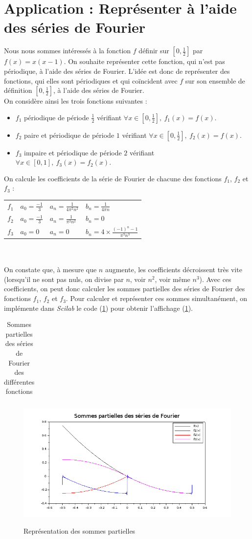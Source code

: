 \documentclass[a4paper,10pt]{report}
\begin{document}
\section{Application : Représenter à l'aide des séries de Fourier}
Nous nous sommes intéressés à la fonction $f$ définir sur $[0,\frac{1}{2}]$ par $f(x)=x(x-1)$. On souhaite représenter cette fonction, qui n'est pas périodique, à l'aide des séries de Fourier. L'idée est donc de représenter des fonctions, qui elles sont périodiques et qui coïncident avec $f$ sur son ensemble de définition $[0,\frac{1}{2}]$, à l'aide des séries de Fourier.\\
On considère ainsi les trois fonctions suivantes :
\begin{itemize}
\item $f_1$ périodique de période $\frac{1}{2}$ vérifiant $\forall x \in [0,\frac{1}{2}], \ f_1(x)=f(x).$
\item $f_2$ paire et périodique de période $1$ vérifiant $\forall x \in [0,\frac{1}{2}], \ f_2(x)=f(x).$
\item $f_3$ impaire et périodique de période $2$ vérifiant $\forall x \in [0,1], \ f_3(x)=f_2(x).$
\end{itemize}
On calcule les coefficients de la série de Fourier de chacune des fonctions $f_1$, $f_2$ et $f_3$ : \\
\begin{tabular}{llll}
$f_1$ & $a_0=\frac{-1}{3}$ & $a_n=\frac{1}{4\pi^2n^2}$ & $b_n=\frac{1}{4\pi n}$ \\
$f_2$ & $a_0=\frac{-1}{3}$ & $a_n=\frac{1}{\pi^2n^2}$ & $b_n=0$ \\
$f_3$ & $a_0=0$ & $a_n=0$ & $b_n=4\times \frac{(-1)^n-1}{\pi^3 n^3}$
\end{tabular} \\ \\
\indent On constate que, à mesure que $n$ augmente, les coefficients décroissent très vite (lorsqu'il ne sont pas nuls, on divise par $n$, voir $n^2$, voir même $n^3$). Avec ces coefficients, on peut donc calculer les sommes partielles des séries de Fourier des fonctions $f_1$, $f_2$ et $f_3$. Pour calculer et représenter ces sommes simultanément, on implémente dans \textit{Scilab} le code (\ref{fourier}) pour obtenir l'affichage (\ref{graph_fourier}).
\begin{table}[H]
\caption{Sommes partielles des séries de Fourier des différentes fonctions}
\begin{tabular}{l}

\label{fourier}
\end{tabular}
\end{table}

\begin{figure}[H]
\centering
\caption{Représentation des sommes partielles}
\includegraphics[width=\textwidth]{fourier.png}
\label{graph_fourier}
\end{figure}
\end{document}

